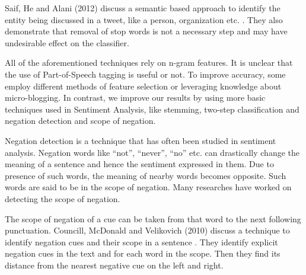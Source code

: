 Saif, He and Alani (2012) discuss a semantic based approach to identify the
entity being discussed in a tweet, like a person, organization etc. \cite{SHA}.
They also demonstrate that removal of stop words is not a necessary step and may
have undesirable effect on the classifier.

All of the aforementioned techniques rely on n-gram features. It is unclear that
the use of Part-of-Speech tagging is useful or not. To improve accuracy, some
employ different methods of feature selection or leveraging knowledge about
micro-blogging. In contrast, we improve our results by using more basic
techniques used in Sentiment Analysis, like stemming, two-step classification
and negation detection and scope of negation.

Negation detection is a technique that has often been studied in sentiment
analysis. Negation words like “not”, “never”, “no” etc. can drastically change
the meaning of a sentence and hence the sentiment expressed in them. Due to
presence of such words, the meaning of nearby words becomes opposite. Such words
are said to be in the scope of negation. Many researches have worked on
detecting the scope of negation.


The scope of negation of a cue can be taken from that word to the next following
punctuation. Councill, McDonald and Velikovich (2010) discuss a technique to
identify negation cues and their scope in a sentence \cite{CMV}. They identify
explicit negation cues in the text and for each word in the scope. Then they
find its distance from the nearest negative cue on the left and right.
